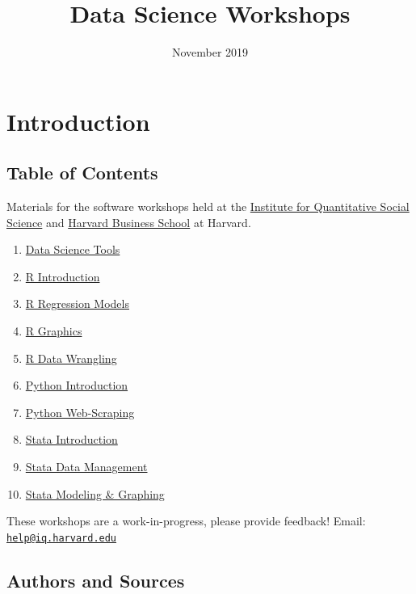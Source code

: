 \documentclass[]{book}
\title{Data Science Workshops}
\author{}
\date{November 2019}
\providecommand{\tightlist}{%
  \setlength{\itemsep}{0pt}\setlength{\parskip}{0pt}}
\begin{document}
\maketitle

{
\setcounter{tocdepth}{1}
\tableofcontents
}
\chapter*{Introduction}\label{introduction}

\section*{Table of Contents}\label{table-of-contents}

Materials for the software workshops held at the
\href{http://iq.harvard.edu}{Institute for Quantitative Social Science}
and \href{https://training.rcs.hbs.org}{Harvard Business School} at
Harvard.

\begin{enumerate}
\def\labelenumi{\arabic{enumi}.}
\tightlist
\item
  \href{./DataScienceTools.html}{Data Science Tools}
\item
  \href{./Rintro.html}{R Introduction}
\item
  \href{./Rmodels.html}{R Regression Models}
\item
  \href{./Rgraphics.html}{R Graphics}
\item
  \href{./RDataWrangling.html}{R Data Wrangling}
\item
  \href{./PythonIntro.html}{Python Introduction}
\item
  \href{./PythonWebScrape.html}{Python Web-Scraping}
\item
  \href{./StataIntro.html}{Stata Introduction}
\item
  \href{./StataDatMan.html}{Stata Data Management}
\item
  \href{./StataModGraph.html}{Stata Modeling \& Graphing}
\end{enumerate}

These workshops are a work-in-progress, please provide feedback! Email:
\href{mailto:help@iq.harvard.edu}{\nolinkurl{help@iq.harvard.edu}}

\section*{Authors and Sources}\label{authors-and-sources}
\end{document}
